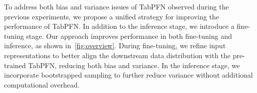 To address both bias and variance issues of TabPFN observed during the previous experiments, we propose a unified strategy for improving the performance of TabPFN. In addition to the inference stage, we introduce a fine-tuning stage. Our approach improves performance in both fine-tuning and inference, as shown in~\autoref{fig:overview}. During fine-tuning, we refine input representations to better align the downstream data distribution with the pre-trained TabPFN, reducing both bias and variance. In the inference stage, we incorporate bootstrapped sampling to further reduce variance without additional computational overhead.%




